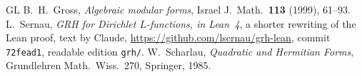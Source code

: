 \documentclass[reqno]{amsart}
\theoremstyle{plain}
\theoremstyle{definition}
\begin{document}
{\small
\begin{thebibliography}{GL}
 B.~H.~Gross, \emph{Algebraic modular forms}, Israel J.\ Math.\ \textbf{113} (1999), 61--93.
 L.~Sernau, \emph{GRH for Dirichlet \(L\)-functions, in Lean~4}, a shorter rewriting of the Lean proof, text by Claude, \url{https://github.com/lsernau/grh-lean}, commit \texttt{72fead1}, readable edition \texttt{grh/}.
 W.~Scharlau, \emph{Quadratic and Hermitian Forms}, Grundlehren Math.\ Wiss.\ 270, Springer, 1985.
\end{thebibliography}
}
\end{document}
